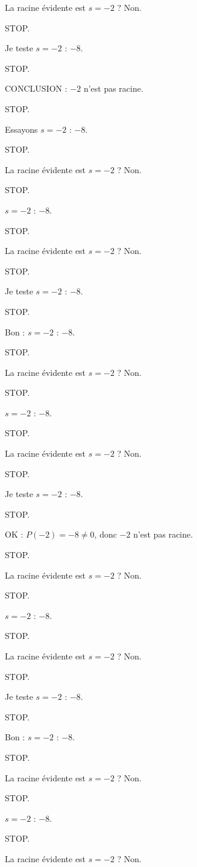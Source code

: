 \documentclass[11pt]{article}
\begin{document}
\begin{exoresolu}
\begin{enumerate}
La racine évidente est $s = -2$ ? Non. 

STOP. 

Je teste $s = -2$ : $-8$. 

STOP. 

CONCLUSION : $-2$ n'est pas racine. 

STOP. 

Essayons $s = -2$ : $-8$. 

STOP. 

La racine évidente est $s = -2$ ? Non. 

STOP. 

$s = -2$ : $-8$. 

STOP. 

La racine évidente est $s = -2$ ? Non. 

STOP. 

Je teste $s = -2$ : $-8$. 

STOP. 

Bon : $s = -2$ : $-8$. 

STOP. 

La racine évidente est $s = -2$ ? Non. 

STOP. 

$s = -2$ : $-8$. 

STOP. 

La racine évidente est $s = -2$ ? Non. 

STOP. 

Je teste $s = -2$ : $-8$. 

STOP. 

OK : $P(-2) = -8 \neq 0$, donc $-2$ n'est pas racine. 

STOP. 

La racine évidente est $s = -2$ ? Non. 

STOP. 

$s = -2$ : $-8$. 

STOP. 

La racine évidente est $s = -2$ ? Non. 

STOP. 

Je teste $s = -2$ : $-8$. 

STOP. 

Bon : $s = -2$ : $-8$. 

STOP. 

La racine évidente est $s = -2$ ? Non. 

STOP. 

$s = -2$ : $-8$. 

STOP. 

La racine évidente est $s = -2$ ? Non. 


\end{enumerate}
\end{exoresolu}
\end{document}
